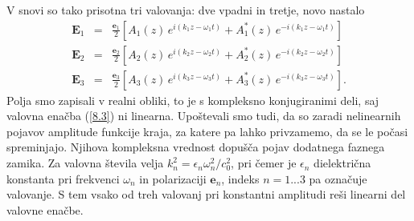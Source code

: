 V snovi so tako prisotna tri valovanja:
dve vpadni in tretje, novo nastalo
\begin{eqnarray}
\mathbf{E}_{1} & = & \frac{\mathbf{e}_{1}}{2}\left[A_{1}(z)\, 
e^{i(k_{1}z-\omega_{1}t)}+A_{1}^{*}(z)\, e^{-i(k_{1}z-\omega_{1}t)}\right]\nonumber \\
\mathbf{E}_{2} & = & \frac{\mathbf{e}_{2}}{2}\left[A_{2}(z)\, 
e^{i(k_{2}z-\omega_{2}t)}+A_{2}^{*}(z)\, e^{-i(k_{2}z-\omega_{2}t)}\right]\nonumber \\
\mathbf{E}_{3} & = & \frac{\mathbf{e}_{3}}{2}\left[A_{3}(z)\, 
e^{i(k_{3}z-\omega_{3}t)}+A_{3}^{*}(z)\, e^{-i(k_{3}z-\omega_{3}t)}\right].
\end{eqnarray}
Polja smo zapisali v realni obliki, to je s kompleksno konjugiranimi
deli, saj valovna enačba (\ref{8.3}) ni linearna. Upoštevali smo tudi,
da so zaradi nelinearnih pojavov amplitude funkcije kraja, za
katere pa lahko privzamemo, da se le počasi spreminjajo. Njihova kompleksna vrednost
dopušča pojav dodatnega faznega zamika. Za valovna
števila velja $k_{n}^{2}=\epsilon_{n}\omega_n^{2}/c_0^{2}$,
pri čemer je $\epsilon_{n}$ dielektrična konstanta pri frekvenci
$\omega_{n}$ in polarizaciji $\mathbf{e}_{n}$, indeks $n = 1...3$ pa označuje
valovanje. S tem vsako od treh valovanj
pri konstantni amplitudi reši linearni del valovne enačbe. 

